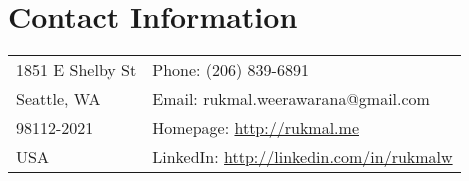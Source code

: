 \documentclass[10pt]{article}
\begin{document}
    


    \section{Contact Information}
    
    \setlength{\tabcolsep}{18pt}

    \begin{center}
        \begin{tabular}{ll}
            1851 E Shelby St & Phone: (206) 839-6891 \\
            Seattle, WA & Email: rukmal.weerawarana@gmail.com \\
            98112-2021 & Homepage: \url{http://rukmal.me} \\
            USA & LinkedIn: \url{http://linkedin.com/in/rukmalw}
        \end{tabular}
    \end{center}
\end{document}
